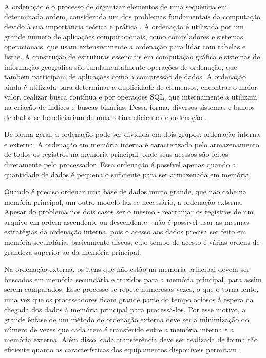 A ordenação é o processo de organizar elementos de uma sequência em determinada ordem, considerada um dos problemas fundamentais da computação devido à sua importância teórica e prática \cite{Knuth:1998, Cormen:2009}. 
A ordenação é utilizada por um grande número de aplicações computacionais, como compiladores e sistemas operacionais, que usam extensivamente a ordenação para lidar com tabelas e listas. 
A construção de estruturas essenciais em computação gráfica e sistemas de informação geográfica são fundamentalmente operações de ordenação, que também participam de aplicações como a compressão de dados. A ordenação ainda é utilizada para determinar a duplicidade de elementos, encontrar o maior valor, realizar busca contínua e por operações SQL, que internamente a utilizam na criação de índices e buscas binárias. Dessa forma, diversos sistemas e bancos de dados se beneficiariam de uma rotina eficiente de ordenação \cite{Lauterbach:2009,Satish:2009,Dean:2008}.




De forma geral, a ordenação pode ser dividida em dois grupos: ordenação interna e externa. 
A ordenação em memória interna é caracterizada pelo armazenamento de todos os registros na memória principal, onde seus acessos são feitos diretamente pelo processador. Essa ordenação é possível apenas quando a quantidade de dados é pequena o suficiente para ser armazenada em memória. 

Quando é preciso ordenar uma base de dados muito grande, que não cabe na memória principal, um outro modelo faz-se necessário, a ordenação externa.
Apesar do problema nos dois casos ser o mesmo - rearranjar os registros de um arquivo em ordem ascendente ou descendente - não é possível usar as mesmas estratégias da ordenação interna, pois o acesso aos dados precisa ser feito em memória secundária, basicamente discos, cujo tempo de acesso é várias ordens de grandeza superior ao da memória principal.  %

Na ordenação externa, os itens que não estão na memória principal devem ser buscados em memória secundária e trazidos para a memória principal, para assim serem comparados. Esse processo se repete numerosas vezes, o que o torna lento, uma vez que os processadores ficam grande parte do tempo ociosos à espera da chegada dos dados à memória principal para processá-los. Por esse motivo, a grande ênfase de um método de ordenação externa deve ser a minimização do número de vezes que cada item é transferido entre a memória interna e a memória externa. Além disso, cada transferência deve ser realizada de forma tão eficiente quanto as características dos equipamentos disponíveis permitam \cite{Ziviani:2007}.



